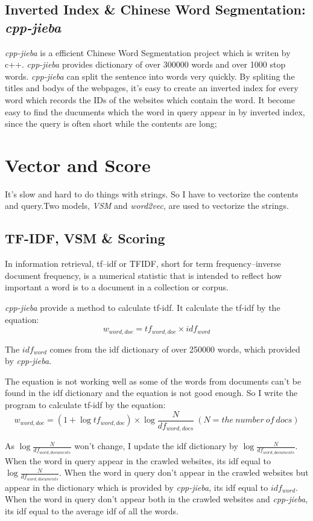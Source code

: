 \documentclass[a4paper]{article}
\begin{document}
\subsection{Inverted Index \& Chinese Word Segmentation: \emph{cpp-jieba}}

\emph{cpp-jieba} is a efficient Chinese Word Segmentation project which is writen by c++. \emph{cpp-jieba} provides dictionary of over 300000 words and over 1000 stop words. \emph{cpp-jieba} can split the sentence into words very quickly.
By spliting the titles and bodys of the webpages, it's easy to create an inverted index for every word which records the IDs of the websites which contain the word. It become easy to find the ducuments which the word in query appear in by inverted index, since the query is often short while the contents are long; 

\section{Vector and Score}

It's slow and hard to do things with strings. So I have to vectorize the contents and query.Two models, \emph{VSM}  and \emph{word2vec}, are used to vectorize the strings.

\subsection{TF-IDF, VSM \& Scoring}

In information retrieval, tf–idf or TFIDF, short for term frequency–inverse document frequency, is a numerical statistic that is intended to reflect how important a word is to a document in a collection or corpus.

\emph{cpp-jieba} provide a method to calculate tf-idf. It calculate the tf-idf by the equation:$$w_{word,doc}=tf_{word,doc}\times idf_{word}$$

The $idf_{word}$ comes from the idf dictionary of over 250000 words, which provided by \emph{cpp-jieba}.

The equation is not working well as some of the words from documents can't be found in the idf dictionary and the equation is not good enough. So I write the program to calculate tf-idf by the equation:$$w_{word,doc}=(1+\log{tf_{word,doc}})\times \log{\frac{N}{df_{word,docs}}}\ (N=the\ number\ of\ docs)$$

As $\log{\frac{N}{df_{word,documents}}}$ won't change, I update the idf dictionary by $\log{\frac{N}{df_{word,documents}}}$. When the word in query appear in the crawled websites, its idf equal to $\log{\frac{N}{df_{word,documents}}}$. When the word in query don't appear in the crawled websites but appear in the dictionary which is provided by \emph{cpp-jieba}, its idf equal to $idf_{word}$. When the word in query don't appear both in the crawled websites and \emph{cpp-jieba}, its idf equal to the average idf of all the words. 
\end{document}
